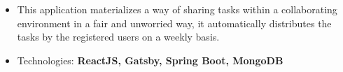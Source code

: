 \documentclass[10pt,a4paper,ragged2e,withhyper]{assets/altacv}
\begin{document}
\begin{paracol}{2}
\divider

\begin{itemize}
    \item This application materializes a way of sharing tasks within a collaborating environment in a fair and unworried way, it automatically distributes the tasks by the registered users on a weekly basis.
    \item Technologies: \textbf{ReactJS, Gatsby, Spring Boot, MongoDB}
\end{itemize}










\end{paracol}
\end{document}
